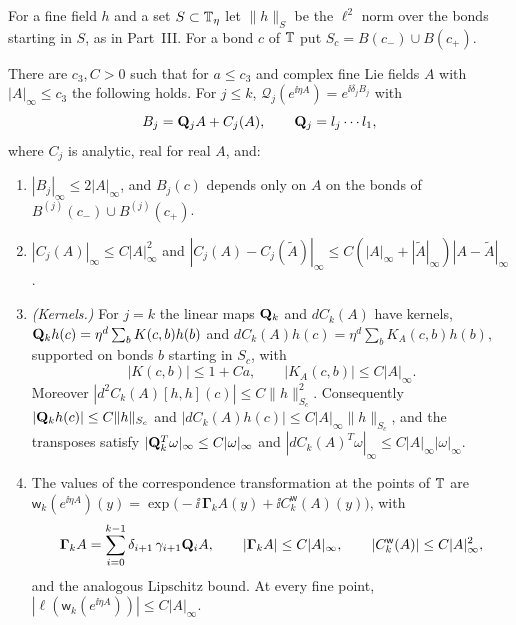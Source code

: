For a fine field $h$ and a set $S\subset\mathbb T_\eta$ let $\|h\|_S$ be the $\ell^2$ norm over the bonds starting in $S$, as in Part~III. For a bond $c$ of $\mathbb T$ put $S_c=B(c_-)\cup B(c_+)$.

\begin{proposition}\label{prop:Q-expansion}
There are $c_3,C>0$ such that for $a\le c_3$ and complex fine Lie fields $A$ with $|A|_\infty\le c_3$ the following holds. For $j\le k$, $\mathcal Q_j(e^{\ii\eta A})=e^{\ii\delta_jB_j}$ with
\[
B_j=\mathbf Q_jA+C_j(A),\qquad \mathbf Q_j=l_j\cdots l_1,
\]
where $C_j$ is analytic, real for real $A$, and:
\begin{enumerate}[label=(\alph*)]
\item $|B_j|_\infty\le2|A|_\infty$, and $B_j(c)$ depends only on $A$ on the bonds of $B^{(j)}(c_-)\cup B^{(j)}(c_+)$.
\item $|C_j(A)|_\infty\le C|A|_\infty^2$ and $|C_j(A)-C_j(\tilde A)|_\infty\le C(|A|_\infty+|\tilde A|_\infty)|A-\tilde A|_\infty$.
\item \emph{(Kernels.)} For $j=k$ the linear maps $\mathbf Q_k$ and $dC_k(A)$ have kernels, $\mathbf Q_kh(c)=\eta^d\sum_bK(c,b)h(b)$ and $dC_k(A)h(c)=\eta^d\sum_bK_A(c,b)h(b)$, supported on bonds $b$ starting in $S_c$, with
\[
|K(c,b)|\le1+Ca,\qquad|K_A(c,b)|\le C|A|_\infty .
\]
Moreover $|d^2C_k(A)[h,h](c)|\le C\|h\|^2_{S_c}$. Consequently $|\mathbf Q_kh(c)|\le C\|h\|_{S_c}$ and $|dC_k(A)h(c)|\le C|A|_\infty\|h\|_{S_c}$, and the transposes satisfy $|\mathbf Q_k^T\omega|_\infty\le C|\omega|_\infty$ and $|dC_k(A)^T\omega|_\infty\le C|A|_\infty|\omega|_\infty$.
\item The values of the correspondence transformation at the points of $\mathbb T$ are $\mathsf w_k(e^{\ii\eta A})(y)=\exp\big(-\ii\,\boldsymbol\Gamma_kA(y)+\ii C^{\mathsf w}_k(A)(y)\big)$, with
\[
\boldsymbol\Gamma_kA=\sum_{i=0}^{k-1}\delta_{i+1}\,\gamma_{i+1}\mathbf Q_iA,\qquad|\boldsymbol\Gamma_kA|\le C|A|_\infty,\qquad|C^{\mathsf w}_k(A)|\le C|A|_\infty^2,
\]
and the analogous Lipschitz bound. At every fine point, $|\ell(\mathsf w_k(e^{\ii\eta A}))|\le C|A|_\infty$.
\end{enumerate}
\end{proposition}

